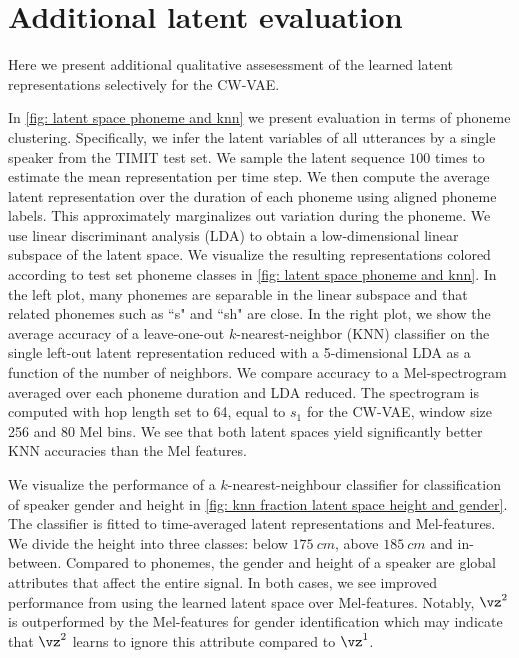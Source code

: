 \section{Additional latent evaluation}\label{app: additional latent space clustering}
Here we present additional qualitative assesessment of the learned latent representations selectively for the CW-VAE. 

In \cref{fig: latent space phoneme and knn} we present evaluation in terms of phoneme clustering. 
Specifically, we infer the latent variables of all utterances by a single speaker from the TIMIT test set. We sample the latent sequence $100$ times to estimate the mean representation per time step. We then compute the average latent representation over the duration of each phoneme using aligned phoneme labels. This approximately marginalizes out variation during the phoneme. We use linear discriminant analysis (LDA) \cite{fisher_use_1936} to obtain a low-dimensional linear subspace of the latent space. 
We visualize the resulting representations colored according to test set phoneme classes in \cref{fig: latent space phoneme and knn}. 
In the left plot, many phonemes are separable in the linear subspace and that related phonemes such as ``s" and ``sh" are close. 
In the right plot, we show the average accuracy of a leave-one-out $k$-nearest-neighbor (KNN) classifier on the single left-out latent representation reduced with a 5-dimensional LDA as a function of the number of neighbors. 
We compare accuracy to a Mel-spectrogram averaged over each phoneme duration and LDA reduced. The spectrogram is computed with hop length set to 64, equal to $s_1$ for the CW-VAE, window size 256 and 80 Mel bins.
We see that both latent spaces yield significantly better KNN accuracies than the Mel features.

We visualize the performance of a $k$-nearest-neighbour classifier for classification of speaker gender and height in \cref{fig: knn fraction latent space height and gender}.
The classifier is fitted to time-averaged latent representations and Mel-features. 
We divide the height into three classes: below $\SI{175}{cm}$, above $\SI{185}{cm}$ and in-between. Compared to phonemes, the gender and height of a speaker are global attributes that affect the entire signal. 
In both cases, we see improved performance from using the learned latent space over Mel-features. Notably, $\vz^2$ is outperformed by the Mel-features for gender identification which may indicate that $\vz^2$ learns to ignore this attribute compared to $\vz^1$.

